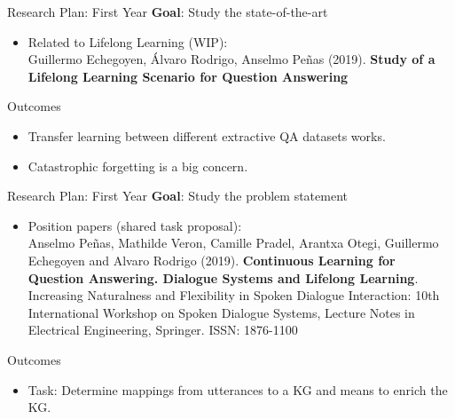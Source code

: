 \documentclass{beamer}
\begin{document}
\begin{frame}{Research Plan: First Year}
  \alert{\textbf{Goal}}: Study the state-of-the-art
  \vspace{0.2cm}
  \begin{itemize}
    \item Related to Lifelong Learning (WIP): \\
      {\small Guillermo Echegoyen, Álvaro Rodrigo, Anselmo Peñas (2019). \textbf{Study of a Lifelong Learning Scenario for Question Answering}}
  \end{itemize}
  \begin{block}{Outcomes}
    \begin{itemize}
      \item Transfer learning between different extractive QA datasets works.
      \item Catastrophic forgetting is a big concern.
    \end{itemize}
  \end{block}
\end{frame}

\begin{frame}{Research Plan: First Year}
  \vspace{-0.4cm}
  \alert{\textbf{Goal}}: Study the problem statement
  \vspace{0.1cm}
  \begin{itemize}
    \item Position papers (shared task proposal): \\
      {\small Anselmo Peñas, Mathilde Veron, Camille Pradel, Arantxa Otegi, Guillermo Echegoyen and Alvaro Rodrigo (2019). \textbf{Continuous Learning for Question Answering. Dialogue Systems and Lifelong Learning}. Increasing Naturalness and Flexibility in Spoken Dialogue Interaction: 10th International Workshop on Spoken Dialogue Systems, Lecture Notes in Electrical Engineering, Springer. ISSN: 1876-1100 \cite{penas2019continuous}}
  \end{itemize}
  \begin{block}{Outcomes}
    \begin{itemize}
      \item Task: Determine mappings from utterances to a KG and means to enrich the KG.
    \end{itemize}
  \end{block}
\end{frame}
\end{document}
